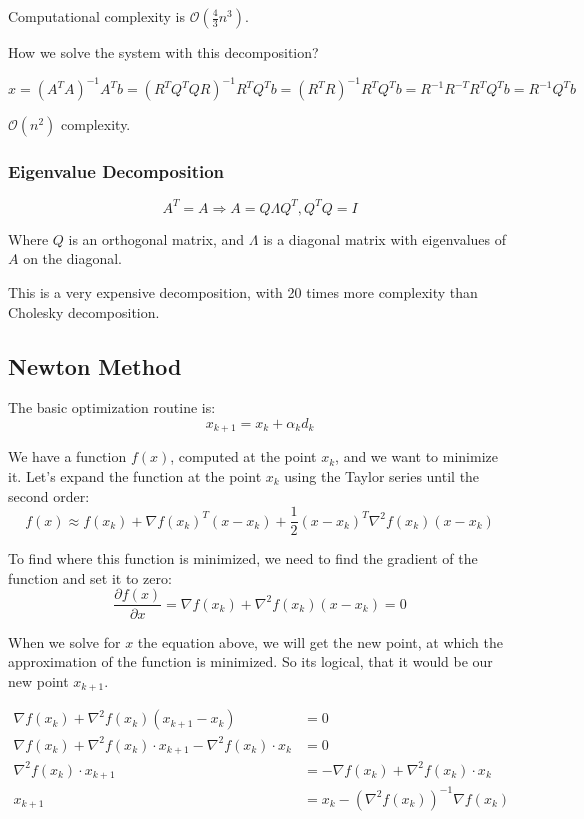 \notice \; Computational complexity is $\mathcal{O}(\frac{4}{3} n^3)$.

How we solve the system with this decomposition?

\[ 
    x = (A^T A)^{-1} A^T b = (R^T Q^T Q R)^{-1} R^T Q^T b = (R^T R)^{-1} R^T Q^T b = R^{-1} R^{-T} R^T Q^T b = R^{-1} Q^T b
\] 

\notice \; $\mathcal{O}(n^2)$ complexity.

\subsubsection{Eigenvalue Decomposition}

\[
    A^T = A \Rightarrow A = Q \Lambda Q^T, Q^T Q = I
\]

Where $Q$ is an orthogonal matrix, and $\Lambda$ is a diagonal matrix with eigenvalues of $A$ on the diagonal.

\notice \; This is a very expensive decomposition, with 20 times more complexity than Cholesky decomposition. 

\subsection{Newton Method}

The basic optimization routine is: 
\[ 
    x_{k+1} = x_k + \alpha_k d_k
\] 

We have a function $f(x)$, computed at the point $x_k$, and we want to minimize it. Let's expand the function at the point $x_k$ using the Taylor series until the second order:
\[
    f(x) \approx f(x_k) + \nabla f(x_k)^T (x - x_k) + \frac{1}{2} (x - x_k)^T \nabla^2 f(x_k) (x - x_k)
\] 

To find where this function is minimized, we need to find the gradient of the function and set it to zero: 
\[ 
    \frac{\partial f(x)}{\partial x} = \nabla f(x_k) + \nabla^2 f(x_k) (x - x_k) = 0 
\] 

When we solve for $x$ the equation above, we will get the new point, at which the approximation of the function is minimized. So its logical, that it would be our new point $x_{k+1}$.

\begin{align*}
    \nabla f(x_k) + \nabla^2 f(x_k) (x_{k+1} - x_k) &= 0 \\ 
    \nabla f(x_k) + \nabla^2 f(x_k) \cdot x_{k+1} - \nabla^2 f(x_k) \cdot x_k &= 0 \\
    \nabla^2 f(x_k) \cdot x_{k+1} &= - \nabla f(x_k) + \nabla^2 f(x_k) \cdot x_k \\
    x_{k+1} &= x_k - (\nabla^2 f(x_k))^{-1} \nabla f(x_k)
\end{align*}

